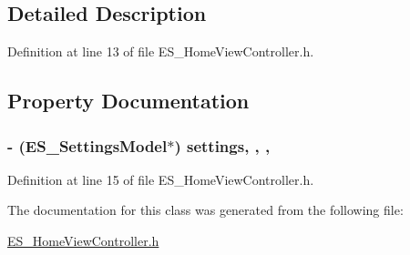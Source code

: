 \subsection{Detailed Description}


Definition at line 13 of file E\+S\+\_\+\+Home\+View\+Controller.\+h.



\subsection{Property Documentation}
\hypertarget{interface_e_s___home_view_controller_a8254a560bea73c4cacb5ae75edd9a4fa}{
\subsubsection[{settings}]{\setlength{\rightskip}{0pt plus 5cm}-\/ (E\+S\+\_\+\+Settings\+Model$\ast$) settings\hspace{0.3cm}{\ttfamily [read]}, {\ttfamily [write]}, {\ttfamily [nonatomic]}, {\ttfamily [strong]}}}\label{interface_e_s___home_view_controller_a8254a560bea73c4cacb5ae75edd9a4fa}


Definition at line 15 of file E\+S\+\_\+\+Home\+View\+Controller.\+h.



The documentation for this class was generated from the following file\+:\begin{DoxyCompactItemize}
\item 
\hyperlink{_e_s___home_view_controller_8h}{E\+S\+\_\+\+Home\+View\+Controller.\+h}\end{DoxyCompactItemize}
